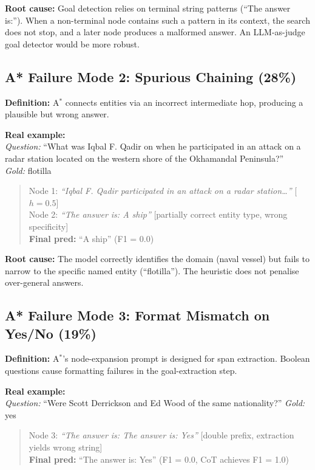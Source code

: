 \documentclass{article}
\newcommand{\astar}{A$^*$\xspace}
\begin{document}
\textbf{Root cause:} Goal detection relies on terminal string patterns (``The answer is:''). When a non-terminal node contains such a pattern in its context, the search does not stop, and a later node produces a malformed answer. An LLM-as-judge goal detector would be more robust.

\subsection{A* Failure Mode 2: Spurious Chaining (28\%)}

\textbf{Definition:} \astar connects entities via an incorrect intermediate hop, producing a plausible but wrong answer.

\textbf{Real example:}\\
\textit{Question:} ``What was Iqbal F. Qadir on when he participated in an attack on a radar station located on the western shore of the Okhamandal Peninsula?''\\
\textit{Gold:} flotilla

\begin{quote}
Node 1: \textit{``Iqbal F. Qadir participated in an attack on a radar station\ldots''} [$h=0.5$]\\
Node 2: \textit{``The answer is: A ship''} [partially correct entity type, wrong specificity]\\
\textbf{Final pred:} ``A ship'' (F1 = 0.0)
\end{quote}

\textbf{Root cause:} The model correctly identifies the domain (naval vessel) but fails to narrow to the specific named entity (``flotilla''). The heuristic does not penalise over-general answers.

\subsection{A* Failure Mode 3: Format Mismatch on Yes/No (19\%)}

\textbf{Definition:} \astar's node-expansion prompt is designed for span extraction. Boolean questions cause formatting failures in the goal-extraction step.

\textbf{Real example:}\\
\textit{Question:} ``Were Scott Derrickson and Ed Wood of the same nationality?'' \textit{Gold:} yes

\begin{quote}
Node 3: \textit{``The answer is: The answer is: Yes''} [double prefix, extraction yields wrong string]\\
\textbf{Final pred:} ``The answer is: Yes'' (F1 = 0.0, CoT achieves F1 = 1.0)
\end{quote}
\end{document}
